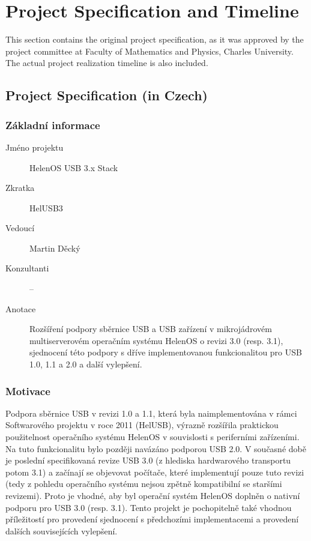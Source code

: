 \chapter{Project Specification and Timeline}

This section contains the original project specification, as it was approved by
the project committee at Faculty of Mathematics and Physics, Charles University.
The actual project realization timeline is also included.


\section{Project Specification (in Czech)}

\subsection{Základní informace}

\begin{description}
	\item[Jméno projektu] HelenOS USB 3.x Stack
	\item[Zkratka] HelUSB3
	\item[Vedoucí] Martin Děcký 
	\item[Konzultanti] --
	\item[Anotace]
		Rozšíření podpory sběrnice USB a USB zařízení v mikrojádrovém multiserverovém operačním systému HelenOS o revizi 3.0 (resp. 3.1), sjednocení této podpory s dříve implementovanou funkcionalitou pro USB 1.0, 1.1 a 2.0 a další vylepšení.
\end{description}

\subsection{Motivace}

Podpora sběrnice USB v revizi 1.0 a 1.1, která byla naimplementována v rámci Softwarového
projektu v roce 2011 (HelUSB), výrazně rozšířila praktickou použitelnost operačního systému
HelenOS v souvislosti s periferními zařízeními. Na tuto funkcionalitu bylo později navázáno
podporou USB 2.0. V současné době je poslední specifikovaná revize USB 3.0 (z hlediska
hardwarového transportu potom 3.1) a začínají se objevovat počítače, které implementují pouze tuto
revizi (tedy z pohledu operačního systému nejsou zpětně kompatibilní se staršími revizemi). Proto
je vhodné, aby byl operační systém HelenOS doplněn o nativní podporu pro USB 3.0 (resp. 3.1).
Tento projekt je pochopitelně také vhodnou příležitostí pro provedení sjednocení s předchozími
implementacemi a provedení dalších souvisejících vylepšení.

